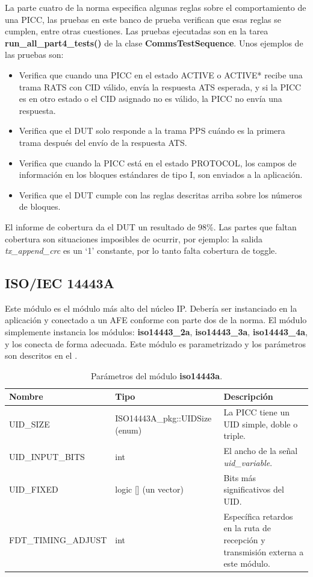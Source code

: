 \documentclass[a4paper, twoside, 11pt]{report}
\begin{document}
La parte cuatro de la norma especifica algunas reglas sobre el comportamiento de una PICC, las pruebas en este banco de prueba verifican que esas reglas se cumplen, entre otras cuestiones. Las pruebas ejecutadas son en la tarea \textbf{run\_all\_part4\_tests()} de la clase \textbf{CommsTestSequence}. Unos ejemplos de las pruebas son:

\begin{itemize}
  \item Verifica que cuando una PICC en el estado ACTIVE o ACTIVE* recibe una trama RATS con CID válido, envía la respuesta ATS esperada, y si la PICC es en otro estado o el CID asignado no es válido, la PICC no envía una respuesta.
  \item Verifica que el DUT solo responde a la trama PPS cuándo es la primera trama después del envío de la respuesta ATS.
  \item Verifica que cuando la PICC está en el estado PROTOCOL, los campos de información en los bloques estándares de tipo I, son enviados a la aplicación. 
  \item Verifica que el DUT cumple con las reglas descritas arriba sobre los números de bloques.
\end{itemize}

El informe de cobertura da el DUT un resultado de 98\%. Las partes que faltan cobertura son situaciones imposibles de ocurrir, por ejemplo: la salida \textit{tx\_append\_crc} es un ‘1’ constante, por lo tanto falta cobertura de toggle.

\FloatBarrier
\subsection{ISO/IEC 14443A}

Este módulo es el módulo más alto del núcleo IP. Debería ser instanciado en la aplicación y conectado a un AFE conforme con parte dos de la norma. El módulo simplemente instancia los módulos: \textbf{iso14443\_2a}, \textbf{iso14443\_3a}, \textbf{iso14443\_4a}, y los conecta de forma adecuada. Este módulo es parametrizado y los parámetros son descritos en el . 

\begin{table}[htb]
  \centering
  \tablezebra
  \begin{tabulary}{\linewidth}{l|l|L}
    \textbf{Nombre}&\textbf{Tipo}&\textbf{Descripción} \\
    \hline
    UID\_SIZE&ISO14443A\_pkg::UIDSize (enum)&La PICC tiene un UID simple, doble o triple. \\
    UID\_INPUT\_BITS&int&El ancho de la señal \textit{uid\_variable}. \\
    UID\_FIXED&logic [] (un vector)&Bits más significativos del UID. \\
    FDT\_TIMING\_ADJUST&int&Específica retardos en la ruta de recepción y transmisión externa a este módulo. \\
  \end{tabulary}
  \caption{Parámetros del módulo \textbf{iso14443a}.}
  \label{tab:params_iso14443a}
\end{table}
\end{document}
